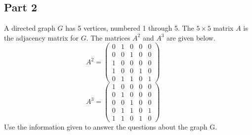 \documentclass{amsart}
\theoremstyle{definition}
\theoremstyle{Exercise}
\theoremstyle{remark}
\theoremstyle{rule}
\numberwithin{equation}{section}
\begin{document}
\subsection*{Part 2}
A directed graph $G$ has 5 vertices, numbered 1 through 5. The $5\times 5$ matrix $A$ is the adjacency matrix for $G$. The matrices $A^2$ and $A^3$ are given below.
\[
A^2  = \left( \begin{array}{ccccc}
0 & 1 & 0 & 0 & 0 \\
0 & 0 & 1 & 0 & 0\\
1 & 0 & 0 & 0 & 0\\
1 & 0 & 0 & 1 & 0\\
0 & 1 & 1 & 0 & 1
\end{array} \right)~~~~~~~
\]
\[
A^3  = \left( \begin{array}{ccccc}
1 & 0 & 0 & 0 & 0 \\
0 & 1 & 0 & 0 & 0\\
0 & 0 & 1 & 0 & 0\\
0 & 1 & 1 & 0 & 1\\
1 & 1 & 0 & 1 & 0
\end{array} \right)~~~~~~~
\]
Use the information given to answer the questions about the graph G.
\end{document}

